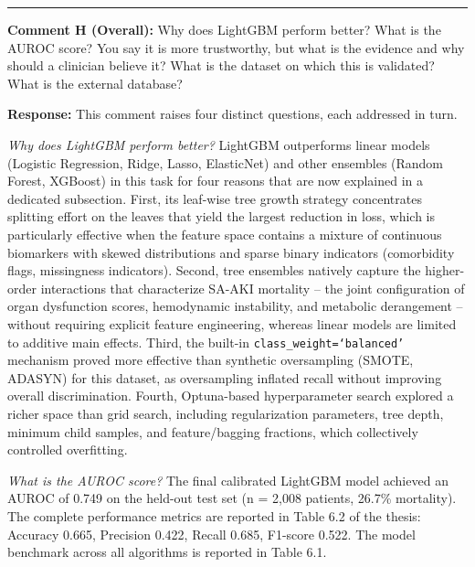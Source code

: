 \documentclass[12pt,a4paper]{article}
\begin{document}
\begin{flushleft}
\vspace{\baselineskip}

\hrule

\vspace{\baselineskip}

\textbf{Comment H (Overall):} Why does LightGBM perform better? What is the AUROC score? You say it is more trustworthy, but what is the evidence and why should a clinician believe it? What is the dataset on which this is validated? What is the external database?

\vspace{\baselineskip}

\textbf{Response:} This comment raises four distinct questions, each addressed in turn.

\textit{Why does LightGBM perform better?} LightGBM outperforms linear models (Logistic Regression, Ridge, Lasso, ElasticNet) and other ensembles (Random Forest, XGBoost) in this task for four reasons that are now explained in a dedicated subsection. First, its leaf-wise tree growth strategy concentrates splitting effort on the leaves that yield the largest reduction in loss, which is particularly effective when the feature space contains a mixture of continuous biomarkers with skewed distributions and sparse binary indicators (comorbidity flags, missingness indicators). Second, tree ensembles natively capture the higher-order interactions that characterize SA-AKI mortality -- the joint configuration of organ dysfunction scores, hemodynamic instability, and metabolic derangement -- without requiring explicit feature engineering, whereas linear models are limited to additive main effects. Third, the built-in \texttt{class\_weight=`balanced'} mechanism proved more effective than synthetic oversampling (SMOTE, ADASYN) for this dataset, as oversampling inflated recall without improving overall discrimination. Fourth, Optuna-based hyperparameter search explored a richer space than grid search, including regularization parameters, tree depth, minimum child samples, and feature/bagging fractions, which collectively controlled overfitting.

\textit{What is the AUROC score?} The final calibrated LightGBM model achieved an AUROC of 0.749 on the held-out test set (n = 2,008 patients, 26.7\% mortality). The complete performance metrics are reported in Table 6.2 of the thesis: Accuracy 0.665, Precision 0.422, Recall 0.685, F1-score 0.522. The model benchmark across all algorithms is reported in Table 6.1.


\end{flushleft}
\end{document}
